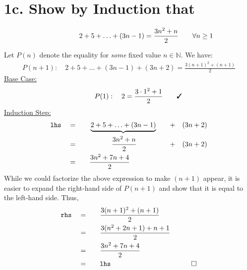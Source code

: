 \documentclass[12pt]{article}
\begin{document}
\section*{1c. Show by Induction that}
\begin{question}
  \begin{align*}
  2 + 5 + \ldots + (3n-1) = \frac{3n^{2}+n}{2} \mathrlap{\qquad \forall n\geq 1}
  \end{align*}
\end{question}
Let $P(n)$ denote	the equality for \textit{some} fixed value $n\in\mathbb{N}$. We have:
\begin{align*}
P(n+1): \quad
  2 + 5 + \ldots + (3n-1) + (3n+2) = \frac{3(n+1)^{2}+(n+1)}{2}
\end{align*}
\underline{Base Case:}
\begin{align*}
P(1): \quad
  2 = \frac{3\cdot1^{2}+1}{2} \mathrlap{\qquad \cmark}
\end{align*}
\underline{Induction Step:}
\begin{alignat*}{4}
\texttt{lhs} \quad
 &=& \quad &\underbrace{2 + 5 + \ldots + (3n-1)} \quad &+ \quad (3n+2) \\
 &=& \quad &\makebox[10em]{$\dfrac{3n^{2}+n}{2}$} &+ \quad (3n+2)  \\
 &=& \quad & \frac{3n^{2}+7n+4}{2}
\end{alignat*}
While we could factorize the above expression to make $(n+1)$ appear, it is easier to expand the right-hand side of $P(n+1)$ and show that it is equal to the left-hand side. Thus,
\begin{alignat*}{4}
\texttt{rhs} \quad
 &=& \quad & \frac{3(n+1)^{2}+(n+1)}{2} \\
 &=& \quad & \frac{3(n^{2}+2n+1)+n+1}{2} \\
 &=& \quad & \frac{3n^{2}+7n+4}{2} \\
 &=& \quad & \texttt{lhs} & \qed 
\end{alignat*}
\end{document}
